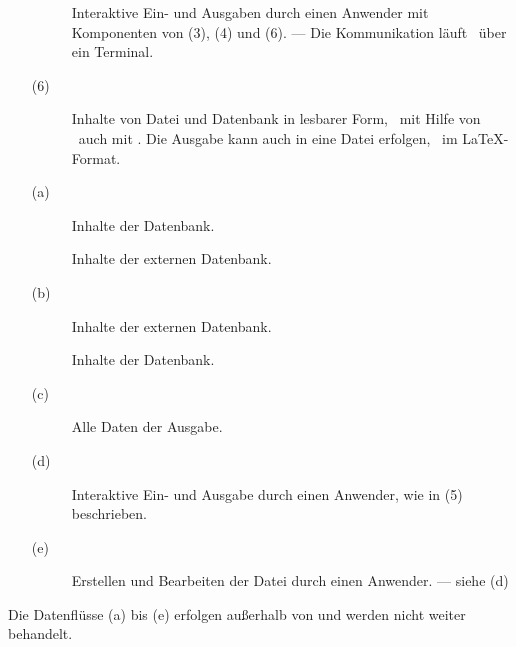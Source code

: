 \begin{itemize}
\begin{description}
		\item[]\label{dat-mitAnwender}
		Interaktive Ein- und Ausgaben durch einen Anwender mit Komponenten von (3), (4) und (6).
		--- Die Kommunikation läuft \textiAlg\ über ein Terminal.
	\end{description}
	\item[(6)]\label{dat-Ausgabe}
	\begin{description}
		\item[]\label{dat-inAusgabe}
		Inhalte von Datei und Datenbank in lesbarer Form, \textua\ mit Hilfe von \Ausgabeschemata\ auch mit \Formeln.
		Die Ausgabe kann auch in eine Datei erfolgen,
		\textzB\ im \LaTeX-Format.
	\end{description}
	\item[(a)]\label{dat-extInternet}
	\begin{description}
		\item[]\label{dat-ausextInternet}
		Inhalte der Datenbank.
		\item[]\label{dat-inextInternet}
		Inhalte der externen Datenbank.
	\end{description}
	\item[(b)]\label{dat-extDatenbank}
	\begin{description}
		\item[]
		\label{dat-ausextDatenbank} Inhalte der externen Datenbank.
		\item[]
		\label{dat-inextDatenbank} Inhalte der Datenbank.
	\end{description}
	\item[(c)]\label{dat-AusgabeAnwender}
	\begin{description}
		\item[]\label{dat-Ausgabe2Anwender}
		Alle Daten der Ausgabe.
	\end{description}
	\item[(d)] \label{dat-AnwenderTerminal}
	\begin{description}
		\item[]\label{dat-Anwender22Terminal}
		Interaktive Ein- und Ausgabe durch einen Anwender, wie in (5) beschrieben.
	\end{description}
	\item[(e)] \label{dat-TerminalDatei}
	\begin{description}
		\item[]\label{dat-Terminal22Datei}
		Erstellen und Bearbeiten der Datei durch einen Anwender.
		--- siehe (d)
	\end{description}
\end{itemize}
Die Datenflüsse (a) bis (e) erfolgen außerhalb von \ASBA
und werden nicht weiter behandelt.

